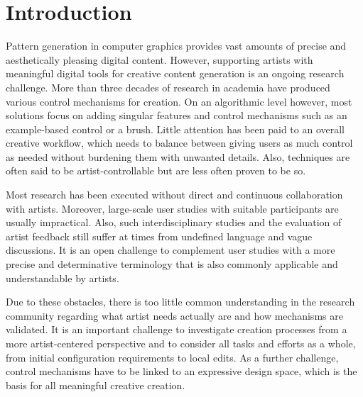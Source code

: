 

\section{Introduction}


Pattern generation in computer graphics provides vast amounts of precise and aesthetically pleasing digital content. However, supporting artists with meaningful digital tools for creative content generation is an ongoing research challenge. More than three decades of research in academia have produced various control mechanisms for creation. On an algorithmic level however, most solutions focus on adding singular features and control mechanisms such as an example-based control or a brush. Little attention has been paid to an overall creative workflow, which needs to balance between giving users as much control as needed without burdening them with unwanted details. Also, techniques are often said to be artist-controllable but are less often proven to be so.

Most research has been executed without direct and continuous collaboration with artists. Moreover, large-scale user studies with suitable participants are usually impractical. Also, such interdisciplinary studies and the evaluation of artist feedback still suffer at times from undefined language and vague discussions. It is an open challenge to complement user studies with a more precise and determinative terminology that is also commonly applicable and understandable by artists.

Due to these obstacles, there is too little common understanding in the research community regarding what artist needs actually are and how mechanisms are validated. It is an important challenge to investigate creation processes from a more artist-centered perspective and to consider all tasks and efforts as a whole, from initial configuration requirements to local edits. As a further challenge, control mechanisms have to be linked to an expressive design space, which is the basis for all meaningful creative creation. 


